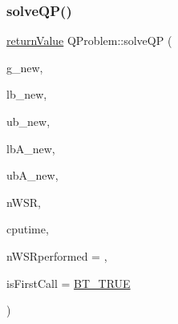 \subsubsection{\texorpdfstring{solve\+Q\+P()}{solveQP()}}
{\footnotesize\ttfamily \hyperlink{_message_handling_8hpp_a81d556f613bfbabd0b1f9488c0fa865e}{return\+Value} Q\+Problem\+::solve\+QP (\begin{DoxyParamCaption}\item[{const \hyperlink{qp_o_a_s_e_s__wrapper_8h_a0d00e2b3dfadee81331bbb39068570c4}{real\+\_\+t} $\ast$const}]{g\+\_\+new,  }\item[{const \hyperlink{qp_o_a_s_e_s__wrapper_8h_a0d00e2b3dfadee81331bbb39068570c4}{real\+\_\+t} $\ast$const}]{lb\+\_\+new,  }\item[{const \hyperlink{qp_o_a_s_e_s__wrapper_8h_a0d00e2b3dfadee81331bbb39068570c4}{real\+\_\+t} $\ast$const}]{ub\+\_\+new,  }\item[{const \hyperlink{qp_o_a_s_e_s__wrapper_8h_a0d00e2b3dfadee81331bbb39068570c4}{real\+\_\+t} $\ast$const}]{lb\+A\+\_\+new,  }\item[{const \hyperlink{qp_o_a_s_e_s__wrapper_8h_a0d00e2b3dfadee81331bbb39068570c4}{real\+\_\+t} $\ast$const}]{ub\+A\+\_\+new,  }\item[{\hyperlink{_types_8hpp_ab6fd6105e64ed14a0c9281326f05e623}{int\+\_\+t} \&}]{n\+W\+SR,  }\item[{\hyperlink{qp_o_a_s_e_s__wrapper_8h_a0d00e2b3dfadee81331bbb39068570c4}{real\+\_\+t} $\ast$const}]{cputime,  }\item[{\hyperlink{_types_8hpp_ab6fd6105e64ed14a0c9281326f05e623}{int\+\_\+t}}]{n\+W\+S\+Rperformed = {},  }\item[{\hyperlink{_types_8hpp_a20f82124c82b6f5686a7fce454ef9089}{Boolean\+Type}}]{is\+First\+Call = {\ttfamily \hyperlink{_types_8hpp_a20f82124c82b6f5686a7fce454ef9089a34c57965bfb07125b09326a69019f9c6}{B\+T\+\_\+\+T\+R\+UE}} }\end{DoxyParamCaption})\hspace{0.3cm}{\ttfamily [protected]}}

